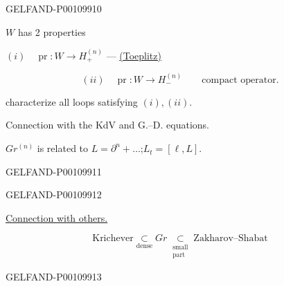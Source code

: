 \begin{GelfandAdjacentEvidence}{GELFAND-P001099}{10}


$W$ has 2 properties

\begin{center}
$(i)\quad\operatorname{pr}:W\to H_+^{(n)}$
\quad — \quad \underline{(Toeplitz)}
\end{center}

\[
(ii)\quad\operatorname{pr}:W\to H_-^{(n)}\qquad\text{compact operator.}
\]

 characterize all loops satisfying $(i),(ii)$.

Connection with the KdV and G.–D. equations.

$Gr^{(n)}$ is related to $L=\partial^n+\ldots$;\quad $L_t=[\ell,L]$.
\end{GelfandAdjacentEvidence}
\begin{GelfandAdjacentEvidence}{GELFAND-P001099}{11}


\end{GelfandAdjacentEvidence}
\begin{GelfandAdjacentEvidence}{GELFAND-P001099}{12}


\underline{Connection with others.}

\[
\text{Krichever}\underset{\text{dense}}{\subset}
Gr\underset{\substack{\text{small}\\\text{part}}}{\subset}\text{Zakharov–Shabat}
\]
\end{GelfandAdjacentEvidence}
\begin{GelfandAdjacentEvidence}{GELFAND-P001099}{13}

\end{GelfandAdjacentEvidence}



